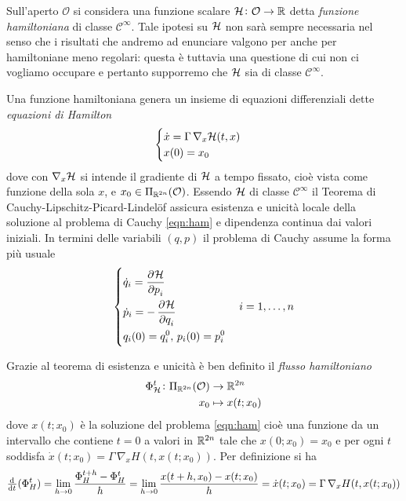 Sull'aperto $ \mathcal{O} $ si considera una funzione scalare $ \mathcal{H} \colon \mathcal{O} \to \mathbb{R} $ detta \emph{funzione hamiltoniana} di classe $ \mathcal{C}^{\infty} $. Tale ipotesi su $ \mathcal{H} $ non sarà sempre necessaria nel senso che i risultati che andremo ad enunciare valgono per anche per hamiltoniane meno regolari: questa è tuttavia una questione di cui non ci vogliamo occupare e pertanto supporremo che $ \mathcal{H} $ sia di classe $ \mathcal{C}^\infty $.

Una funzione hamiltoniana genera un insieme di equazioni differenziali dette \emph{equazioni di Hamilton}
\begin{equation} \label{eqn:ham}
    \begin{cases}
    \dot{x} = \Gamma \, \nabla_x \mathcal{H}(t, x) \\
    x(0) = x_0
    \end{cases}
\end{equation}
dove con $ \nabla_x \mathcal{H} $ si intende il gradiente di $ \mathcal{H} $ a tempo fissato, cioè vista come funzione della sola $ x $, e $ x_0 \in \Pi_{\mathbb{R}^{2n}}(\mathcal{O}) $. Essendo $ \mathcal{H} $ di classe $ \mathcal{C}^\infty $ il Teorema di Cauchy-Lipschitz-Picard-Lindelöf assicura esistenza e unicità locale della soluzione al problema di Cauchy \eqref{eqn:ham} e dipendenza continua dai valori iniziali. In termini delle variabili $ (q, p) $ il problema di Cauchy assume la forma più usuale
\begin{equation}
    \begin{dcases}
        \dot{q}_i = \dpd{\ham}{p_i} \\
        \dot{p}_i = -\dpd{\ham}{q_i} \\
        q_i(0) = q_{i}^0, \, p_i(0) = p_i^0 \\
    \end{dcases}
    \quad i = 1, \ldots, n
\end{equation}

Grazie al teorema di esistenza e unicità è ben definito il \emph{flusso hamiltoniano}
\begin{align}
    \Phi_{\mathcal{H}}^t \colon \Pi_{\mathbb{R}^{2n}}(\mathcal{O}) & \to \mathbb{R}^{2n} \\
    x_0 & \mapsto x(t; x_0)
\end{align}
dove $ x(t; x_0) $ è la soluzione del problema \eqref{eqn:ham} cioè una funzione da un intervallo che contiene $ t=0 $ a valori in $ \mathbb{R}^{2n} $ tale che $ x(0; x_0) = x_0 $ e per ogni $ t $ soddisfa $ \dot{x}(t; x_0) = \Gamma \, \nabla_x H(t, x(t; x_0)) $. Per definizione si ha
\[
    \od{}{t} (\Phi^t_H) = \lim_{h \to 0} \frac{\Phi^{t+h}_H - \Phi^{t}_H}{h} = \lim_{h \to 0} \frac{x(t+h, x_0) - x(t; x_0)}{h} = \dot{x}(t; x_0) = \Gamma \, \nabla_x H(t, x(t; x_0))
\]

